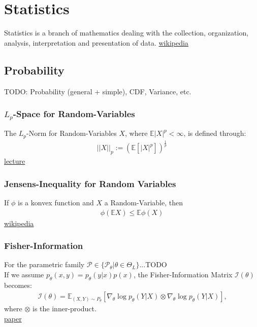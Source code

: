 \chapter{Statistics}
Statistics is a branch of mathematics dealing with the collection, organization, analysis, interpretation and presentation of data.
\href{https://en.wikipedia.org/wiki/Statistics}{wikipedia}

\section{Probability}
TODO: Probability (general + simple), CDF, Variance, etc.
\subsection{$L_p$-Space for Random-Variables}
The $L_p$-Norm for Random-Variables $X$, where $\mathbb{E}|X|^p < \infty$, is defined through:
\begin{align*}
	||X||_p:=(\mathbb{E}[|X|^p])^{\frac{1}{p}}
\end{align*}
\href{http://www2.stat.duke.edu/courses/Fall18/sta711/lec/wk-05.pdf}{lecture}

\subsection{Jensens-Inequality for Random Variables}
If $\phi$ is a konvex function and $X$ a Random-Variable, then
\begin{align*}
	\phi(\mathbb{E}X) \leq \mathbb{E}\phi(X)
\end{align*}
\href{https://en.wikipedia.org/wiki/Jensen%27s_inequality}{wikipedia}

\subsection{Fisher-Information}
For the parametric family $\mathcal{P} \in \{ \mathcal{P}_\theta | \theta \in \Theta_L\}$...TODO\\
If we assume $p_\theta(x,y)=p_\theta(y|x)p(x)$, the Fisher-Information Matrix $\mathcal{I}(\theta)$ becomes:
\begin{align*}
	\mathcal{I}(\theta) = \mathbb{E}_{(X,Y)\sim {P}_\theta}[\nabla_{\theta}\log p_{\theta}(Y|X)\otimes\nabla_{\theta}\log p_{\theta}(Y|X)]\text{,}
\end{align*}
where $\otimes$ is the inner-product.\\
\href{https://arxiv.org/abs/1711.01530}{paper}

